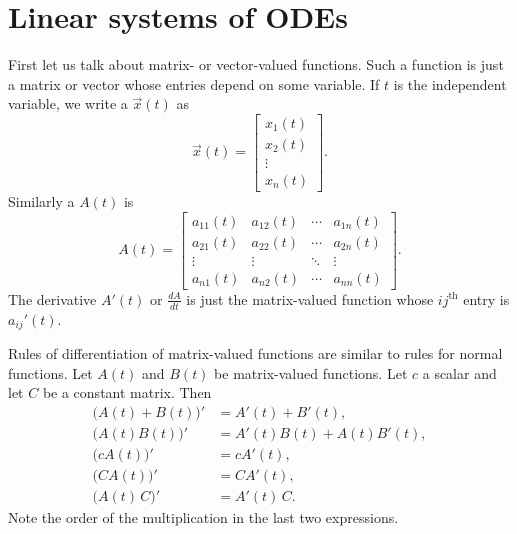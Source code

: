 
\sectionnewpage
\section{Linear systems of ODEs}
\label{linsystems:section}


First let us talk about matrix- or vector-valued functions.  
Such a function is
just a matrix or vector whose entries depend on some variable.
If $t$ is the independent variable, we write a
\emph{}
$\vec{x}(t)$ as
\begin{equation*}
\vec{x}(t) = \begin{bmatrix}
x_1(t) \\
x_2(t) \\
\vdots \\
x_n(t)
\end{bmatrix} .
\end{equation*}
Similarly a \emph{} $A(t)$ is
\begin{equation*}
A(t) =
\begin{bmatrix}
a_{11}(t) & a_{12}(t) & \cdots & a_{1n}(t) \\
a_{21}(t) & a_{22}(t) & \cdots & a_{2n}(t) \\
\vdots & \vdots & \ddots & \vdots \\
a_{n1}(t) & a_{n2}(t) & \cdots & a_{nn}(t)
\end{bmatrix} .
\end{equation*}
The derivative $A'(t)$ or $\frac{dA}{dt}$ is
just the matrix-valued function
whose $ij^{\text{th}}$ entry is $a_{ij}'(t)$.

Rules of differentiation of matrix-valued functions
are similar to rules for normal
functions.  Let $A(t)$ and $B(t)$ be matrix-valued
functions.  Let $c$ a scalar and let $C$ be a constant matrix.
Then
\begin{equation*}
\begin{aligned}
\bigl(A(t)+B(t)\bigr)' & = A'(t) + B'(t), \\
\bigl(A(t)B(t)\bigr)' & = A'(t)B(t) + A(t)B'(t), \\
\bigl(cA(t)\bigr)' & = cA'(t), \\
\bigl(CA(t)\bigr)' & = CA'(t), \\
\bigl(A(t)\,C\bigr)' & = A'(t)\,C .
\end{aligned}
\end{equation*}
Note the order of the multiplication in the last two expressions.

